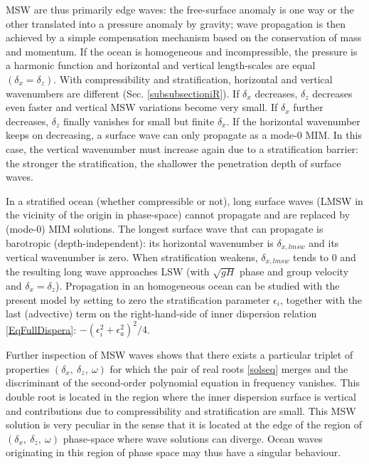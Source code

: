 MSW are thus primarily edge waves: the free-surface anomaly is one way or the other translated into a pressure anomaly by gravity; wave propagation is then achieved by a simple compensation mechanism based on the conservation of mass and momentum. If the ocean is homogeneous and incompressible, the pressure is a harmonic function and horizontal and vertical length-scales are equal $(\delta_x=\delta_z)$. With compressibility and stratification, horizontal and vertical wavenumbers are different (Sec. \ref{subsubsectioniR}). If $\delta_x$ decreases, $\delta_z$ decreases even faster and vertical MSW variations become very small. If $\delta_x$ further decreases, $\delta_z$ finally vanishes for small but finite $\delta_x$. If the horizontal wavenumber keeps on decreasing, a surface wave can only propagate as a mode-0 MIM. In this case, the vertical wavenumber must increase again due to a stratification barrier: the stronger the stratification, the shallower the penetration depth of surface waves.

In a stratified ocean (whether compressible or not), long surface waves (LMSW in the vicinity of the origin in phase-space) cannot propagate and are replaced by (mode-0) MIM solutions. The longest surface wave that can propagate is barotropic (depth-independent): its horizontal wavenumber is $\delta_{x,lmsw}$ and its vertical wavenumber is zero. When stratification weakens, $\delta_{x,lmsw}$ tends to 0 and the resulting long wave approaches LSW (with $\sqrt{g H}$ phase and group velocity and $\delta_x=\delta_z$).
Propagation in an homogeneous ocean can be studied with the present model by setting to zero the stratification parameter $\epsilon_i$, together with the last (advective) term on the right-hand-side of inner dispersion relation \ref{EqFullDispera}: $-(\epsilon_i^2+\epsilon_a^2)^2/4$. 

Further inspection of MSW waves shows that there exists a particular triplet of properties $(\delta_x,\ \delta_z,\ \omega)$ for which the pair of real roots \ref{solseq} merges and the discriminant of the second-order polynomial equation in frequency vanishes. This double root is located in the region where the inner dispersion surface is vertical and contributions due to compressibility and stratification are small. This MSW solution is very peculiar in the sense that it is located at the edge of the region of $(\delta_x,\ \delta_z,\ \omega)$ phase-space where wave solutions can diverge. Ocean waves originating in this region of phase space may thus have a singular behaviour.\\